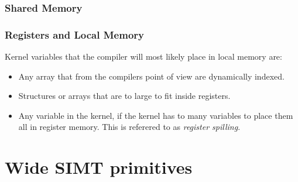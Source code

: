 \subsubsection{Shared Memory}





\subsubsection{Registers and Local Memory}

Kernel variables that the compiler will most likely place in local memory are:

\begin{itemize}
  \item Any array that from the compilers point of view are dynamically indexed.
  \item Structures or arrays that are to large to fit inside registers.
  \item Any variable in the kernel, if the kernel has to many
    variables to place them all in register memory. This is referered
    to as \textit{register spilling}.
\end{itemize}









\section{Wide SIMT primitives}\label{sec:GPUprims}




